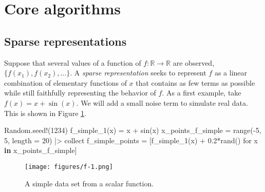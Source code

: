 \documentclass[
]{article}
\newenvironment{Shaded}{\begin{snugshade}}{\end{snugshade}}
\newcommand{\BuiltInTok}[1]{\textcolor[rgb]{0.00,0.23,0.31}{#1}}
\newcommand{\FloatTok}[1]{\textcolor[rgb]{0.68,0.00,0.00}{#1}}
\newcommand{\FunctionTok}[1]{\textcolor[rgb]{0.28,0.35,0.67}{#1}}
\newcommand{\KeywordTok}[1]{\textcolor[rgb]{0.00,0.23,0.31}{\textbf{#1}}}
\newcommand{\NormalTok}[1]{\textcolor[rgb]{0.00,0.23,0.31}{#1}}
\newcommand{\OperatorTok}[1]{\textcolor[rgb]{0.37,0.37,0.37}{#1}}
\begin{document}
\section{Core algorithms}\label{core-algorithms}

\subsection{Sparse representations}\label{sparse-representations}

Suppose that several values of a function of
\(f : \mathbb{R} \to \mathbb{R}\) are observed,
\(\{f(x_1), f(x_2), \dots \}\). A \emph{sparse representation} seeks to
represent \(f\) as a linear combination of elementary functions of \(x\)
that contains as few terms as possible while still faithfully
representing the behavior of \(f\). As a first example, take
\(f(x) = x + \sin(x)\). We will add a small noise term to simulate real
data. This is shown in Figure \ref{fig:f-1}.

\begin{Shaded}
\begin{Highlighting}[]
\BuiltInTok{Random}\NormalTok{.}\FunctionTok{seed!}\NormalTok{(}\FloatTok{1234}\NormalTok{)}
\FunctionTok{f\_simple\_1}\NormalTok{(x) }\OperatorTok{=}\NormalTok{ x }\OperatorTok{+} \FunctionTok{sin}\NormalTok{(x)}
\NormalTok{x\_points\_f\_simple }\OperatorTok{=} \FunctionTok{range}\NormalTok{(}\OperatorTok{{-}}\FloatTok{5}\NormalTok{, }\FloatTok{5}\NormalTok{, length }\OperatorTok{=} \FloatTok{20}\NormalTok{) }\OperatorTok{|\textgreater{}}\NormalTok{ collect}
\NormalTok{f\_simple\_points }\OperatorTok{=}\NormalTok{ [}\FunctionTok{f\_simple\_1}\NormalTok{(x) }\OperatorTok{+} \FloatTok{0.2}\FunctionTok{*rand}\NormalTok{() for x }\KeywordTok{in}\NormalTok{ x\_points\_f\_simple]}
\end{Highlighting}
\end{Shaded}

\begin{figure}
    \centering
    \texttt{[image: figures/f-1.png]}
    \caption{A simple data set from a scalar function.}
    \label{fig:f-1}
\end{figure}
\end{document}
